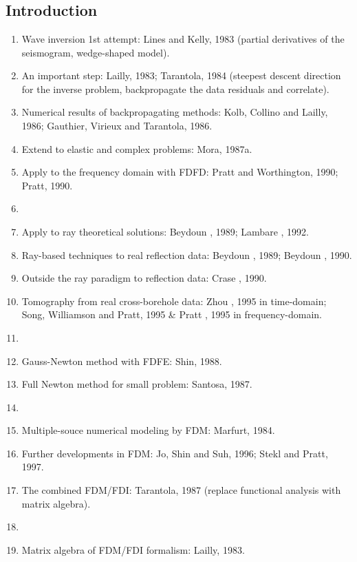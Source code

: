 \renewcommand{\pmk}{Pratt\_1997\_GJI\_Newton methods}
\renewcommand{\prf}{FWI/\pmk.pdf}
\renewcommand{\pti}{Gauss-Newton and full Newton methods in frequency-space seismic waveform inversion}
\renewcommand{\pay}{R. G. Pratt, C. Shin and G. J. Hicks, 1997}
\renewcommand{\pjo}{Geophys. J. Int.}
\renewcommand{\pda}{2016/9/3 Sun.}
\section{\pinfo}
\subsection{Introduction}
\begin{enumerate}[\hspace{10mm}*]
  \item Wave inversion 1st attempt: Lines and Kelly, 1983 (partial derivatives of the seismogram, wedge-shaped model).
  \item An important step: Lailly, 1983; Tarantola, 1984 (steepest descent direction for the inverse problem, backpropagate the data residuals and correlate).
  \item Numerical results of backpropagating methods: Kolb, Collino and Lailly, 1986; Gauthier, Virieux and Tarantola, 1986.
  \item Extend to elastic and complex problems: Mora, 1987a.
  \item Apply to the frequency domain with FDFD: Pratt and Worthington, 1990; Pratt, 1990.
  \item \sline
  \item Apply to ray theoretical solutions: Beydoun \etal, 1989; Lambare \etal, 1992.
  \item Ray-based techniques to real reflection data: Beydoun \etal, 1989; Beydoun \etal, 1990.
  \item Outside the ray paradigm to reflection data: Crase \etal, 1990.
  \item Tomography from real cross-borehole data: Zhou \etal, 1995 in time-domain; Song, Williamson and Pratt, 1995 \& Pratt \etal, 1995 in frequency-domain.
  \item \sline
  \item Gauss-Newton method with FDFE: Shin, 1988.
  \item Full Newton method for small problem: Santosa, 1987.
  \item \sline
  \item Multiple-souce numerical modeling by FDM: Marfurt, 1984.
  \item Further developments in FDM: Jo, Shin and Suh, 1996; Stekl and Pratt, 1997.
  \item The combined FDM/FDI: Tarantola, 1987 (replace functional analysis with matrix algebra).
  \item \sline
  \item Matrix algebra of FDM/FDI formalism: Lailly, 1983.
\end{enumerate}\par

